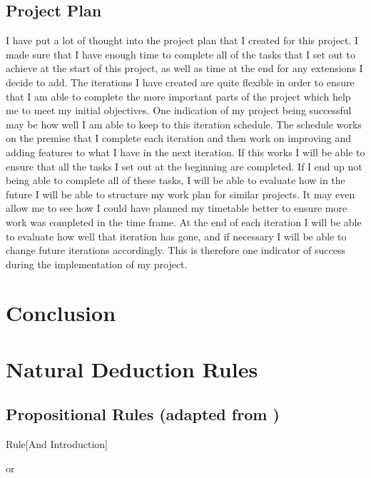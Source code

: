 \subsection{Project Plan}

I have put a lot of thought into the project plan that I created for this project. I made sure that I have enough time to complete all of the tasks that I set out to achieve at the start of this project, as well as time at the end for any extensions I decide to add. The iterations I have created are quite flexible in order to ensure that I am able to complete the more important parts of the project which help me to meet my initial objectives. One indication of my project being successful  may be how well I am able to keep to this iteration schedule. The schedule works on the premise that I complete each iteration and then work on improving and adding features to what I have in the next iteration. If this works I will be able to ensure that all the tasks I set out at the beginning are completed. If I end up not being able to complete all of these tasks, I will be able to evaluate how in the future I will be able to structure my work plan for similar projects. It may even allow me to see how I could have planned my timetable better to ensure more work was completed in the time frame. At the end of each iteration I will be able to evaluate how well that iteration has gone, and if necessary I will be able to change future iterations accordingly. This is therefore one indicator of success during the implementation of my project.
\pagebreak

\section{Conclusion}

\appendix
\section{Natural Deduction Rules}
\label{appendix:nd}

\subsection{Propositional Rules (adapted from \cite{ndBook})}
\label{appendix:nd-prop}

\begin{namedthm}{Rule}[And Introduction]

\begin{bprooftree}
\end{bprooftree}\qquad or \qquad
\begin{bprooftree}
\end{bprooftree}

\end{namedthm}

